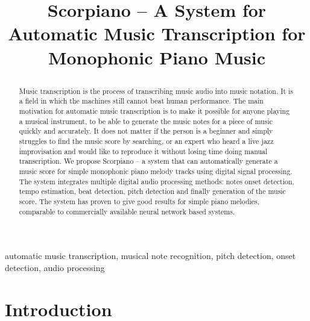 \documentclass[conference]{IEEEtran}
\begin{document}
\title{
\vspace{0pt}
\begin{center}
\Huge
Scorpiano -- A System for Automatic Music Transcription for Monophonic Piano Music
\end{center}
}

\author{
}

\maketitle
\begin{abstract}
Music transcription is the process of transcribing music audio into music notation.
It is a field in which the machines still cannot beat human performance.
The main motivation for automatic music transcription is to make it possible for anyone playing a musical instrument, to be able to generate the music notes for a piece of music quickly and accurately.
It does not matter if the person is a beginner and simply struggles to find the music score by searching, or an expert who heard a live jazz improvisation and would like to reproduce it without losing time doing manual transcription.
We propose Scorpiano -- a system that can automatically generate a music score for simple monophonic piano melody tracks using digital signal processing. 
The system integrates multiple digital audio processing methods: notes onset detection, tempo estimation, beat detection, pitch detection and finally generation of the music score.
The system has proven to give good results for simple piano melodies, comparable to commercially available neural network based systems.
\end{abstract}

\begin{IEEEkeywords}
automatic music transcription, musical note recognition, pitch detection, onset detection, audio processing
\vspace{10mm}
\end{IEEEkeywords}

\section{Introduction}
\end{document}
